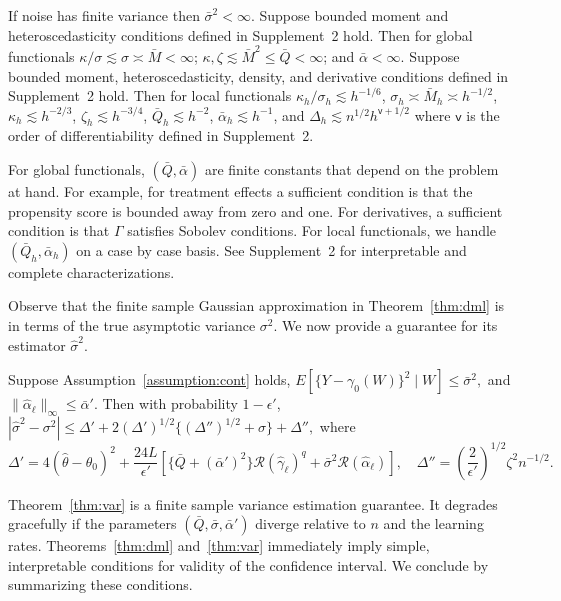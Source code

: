 \begin{theorem}\label{thm:local}
If noise has finite variance then $\bar{\sigma}^2<\infty$. Suppose bounded moment and heteroscedasticity conditions defined in Supplement~2 hold. Then for global functionals
$
\kappa/\sigma \lesssim \sigma \asymp \bar{M} < \infty$; $\kappa, \zeta\lesssim \bar{M}^2\leq \bar{Q}<\infty$; and $\bar{\alpha}<\infty.$
Suppose bounded moment, heteroscedasticity, density, and derivative conditions defined in Supplement~2 hold. Then for local functionals
$
\kappa_h/\sigma_h \lesssim h^{-1/6}$, $\sigma_h \asymp \bar{M}_h \asymp h^{-1/2} $, $\kappa_h\lesssim h^{-2/3}$, $\zeta_h\lesssim h^{-3/4}$, 
$
\bar{Q}_h\lesssim h^{-2}$, $\bar{\alpha}_h\lesssim h^{-1}$, and $\Delta_h \lesssim n^{1/2} h^{\mathsf{v}+1/2}
$
where $\mathsf{v}$ is the order of differentiability defined in Supplement~2.
\end{theorem}
For global functionals, $(\bar{Q},\bar{\alpha})$ are finite constants that depend on the problem at hand. For example, for treatment effects a sufficient condition is that the propensity score is bounded away from zero and one. For derivatives, a sufficient condition is that $\Gamma$ satisfies Sobolev conditions. For local functionals, we handle $(\bar{Q}_h,\bar{\alpha}_h)$ on a case by case basis. See Supplement~2 for interpretable and complete characterizations.%

Observe that the finite sample Gaussian approximation in Theorem~\ref{thm:dml} is in terms of the true asymptotic variance $\sigma^2$. We now provide a guarantee for its estimator $\hat{\sigma}^2$.

\begin{theorem}\label{thm:var}
Suppose Assumption~\ref{assumption:cont} holds, $
E[\{Y-\gamma_0(W)\}^2 \mid W]\leq \bar{\sigma}^2,$ and $\|\hat{\alpha}_{\ell}\|_{\infty}\leq\bar{\alpha}'.
$
Then with probability $1-\epsilon'$,
$
|\hat{\sigma}^2-\sigma^2|\leq \Delta'+2(\Delta')^{1/2}\{(\Delta'')^{1/2}+\sigma\}+\Delta'',
$ where
$$
 \Delta'=4(\hat{\theta}-\theta_0)^2+\frac{24 L}{\epsilon'}\left[\{\bar{Q}+(\bar{\alpha}')^2\}\mathcal{R}(\hat{\gamma}_{\ell})^q+\bar{\sigma}^2\mathcal{R}(\hat{\alpha}_{\ell})\right],\quad 
    \Delta''=\left(\frac{2}{\epsilon'}\right)^{1/2}\zeta^2 n^{-1/2}.
$$
\end{theorem}
Theorem~\ref{thm:var} is a finite sample variance estimation guarantee. It degrades gracefully if the parameters $(\bar{Q},\bar{\sigma},\bar{\alpha}')$ diverge relative to $n$ and the learning rates. Theorems~\ref{thm:dml} and~\ref{thm:var} immediately imply simple, interpretable conditions for validity of the confidence interval. We conclude by summarizing these conditions.

